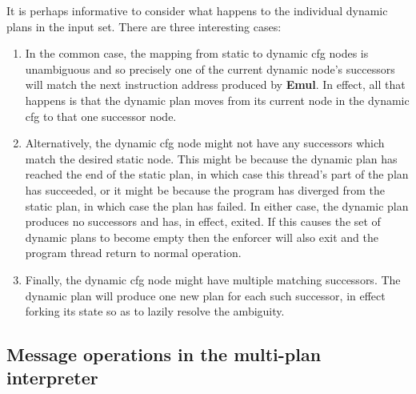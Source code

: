 It is perhaps informative to consider what happens to the individual
dynamic plans in the input set.  There are three interesting cases:
\begin{enumerate}
\item In the common case, the mapping from static to dynamic \gls{cfg}
  nodes is unambiguous and so precisely one of the current dynamic
  node's successors will match the next instruction address produced
  by \textbf{Emul}.  In effect, all that happens is that the dynamic
  plan moves from its current node in the dynamic \gls{cfg} to that
  one successor node.

\item Alternatively, the dynamic \gls{cfg} node might not have any
  successors which match the desired static node.  This might be
  because the dynamic plan has reached the end of the static plan, in
  which case this thread's part of the plan has succeeded, or it might
  be because the program has diverged from the static plan, in which
  case the plan has failed.  In either case, the dynamic plan produces
  no successors and has, in effect, exited.  If this causes the set of
  dynamic plans to become empty then the enforcer will also exit and
  the program thread return to normal operation.

\item Finally, the dynamic \gls{cfg} node might have multiple matching
  successors.  The dynamic plan will produce one new plan for each
  such successor, in effect forking its state so as to lazily resolve
  the ambiguity.
\end{enumerate}

\subsection{Message operations in the multi-plan interpreter}
\label{sect:enforce:hli_messages}


